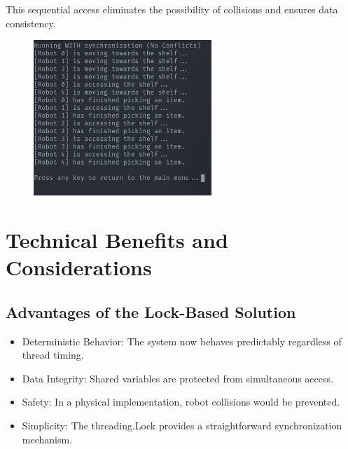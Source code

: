 \documentclass{article}
\begin{document}
This sequential access eliminates the possibility of collisions and ensures data consistency.

\begin{figure}[H]
	\centering
	\includegraphics[width=0.6\textwidth]{./images/good_ending.png}
\end{figure}

\section{Technical Benefits and Considerations}
\subsection{Advantages of the Lock-Based Solution}

\begin{itemize}
	\item Deterministic Behavior: The system now behaves predictably regardless of thread timing.
	\item Data Integrity: Shared variables are protected from simultaneous access.
	\item Safety: In a physical implementation, robot collisions would be prevented.
	\item Simplicity: The threading.Lock provides a straightforward synchronization mechanism.
\end{itemize}
\end{document}
